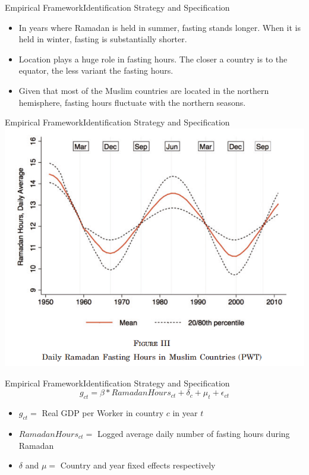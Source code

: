 \documentclass[pdftex,12pt,xcolor=pdftex,table]{beamer}
\begin{document}
    \begin{frame}{Empirical Framework}{Identification Strategy and Specification}
    \begin{itemize}
    \item<1-> In years where Ramadan is held in summer, fasting stands longer. When it is held in winter, fasting is substantially shorter.
    \item<2-> Location plays a huge role in fasting hours. The closer a country is to the equator, the less variant the fasting hours.
    \item<3-> Given that most of the Muslim countries are located in the northern hemisphere, fasting hours fluctuate with the northern seasons.
    \end{itemize}
    \end{frame}
    
    \begin{frame}{Empirical Framework}{Identification Strategy and Specification}
    \centering
    \includegraphics[scale=0.65]{dailyramadan.png}
    \end{frame}
    
    \begin{frame}{Empirical Framework}{Identification Strategy and Specification}
    \begin{equation}
    \nonumber g_{ct}=\beta *RamadanHours_{ct}+\delta_c+\mu_t+\epsilon_{ct}
    \end{equation}
    \vspace{0.5cm}
    \begin{itemize}
    \item<2-> $g_{ct}=$ Real GDP per Worker in country $c$ in year $t$
    \item<3-> $RamadanHours_{ct}=$ Logged average daily number of fasting hours during Ramadan
    \item<4-> $\delta$ and $\mu=$ Country and year fixed effects respectively
    \end{itemize}
    \end{frame}
    
\end{document}
